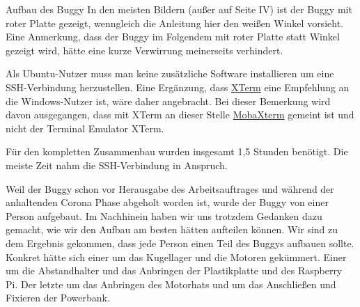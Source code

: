 \documentclass[12pt,twoside]{report}
\begin{document}
\begin{section}{Aufbau des Buggy}
In den meisten Bildern (außer auf Seite IV) ist der Buggy mit roter Platte gezeigt, wenngleich die Anleitung hier den weißen Winkel vorsieht. Eine Anmerkung, dass der Buggy im Folgendem mit roter Platte statt Winkel gezeigt wird, hätte eine kurze Verwirrung meinerseits verhindert.

Als Ubuntu-Nutzer muss man keine zusätzliche Software installieren um eine SSH-Verbindung herzustellen. Eine Ergänzung, dass \href{https://invisible-island.net/xterm/}{XTerm} eine Empfehlung an die Windows-Nutzer ist, wäre daher angebracht. Bei dieser Bemerkung wird davon ausgegangen, dass mit XTerm an dieser Stelle \href{https://mobaxterm.mobatek.net/}{MobaXterm} gemeint ist und nicht der Terminal Emulator XTerm. 

Für den kompletten Zusammenbau wurden insgesamt 1,5 Stunden benötigt. Die meiste Zeit nahm die SSH-Verbindung in Anspruch.

Weil der Buggy schon vor Herausgabe des Arbeitsauftrages und während der anhaltenden Corona Phase abgeholt worden ist, wurde der Buggy von einer Person aufgebaut. Im Nachhinein haben wir uns trotzdem Gedanken dazu gemacht, wie wir den Aufbau am besten hätten aufteilen können. Wir sind zu dem Ergebnis gekommen, dass jede Person einen Teil des Buggys aufbauen sollte. Konkret hätte sich einer um das Kugellager und die Motoren gekümmert. Einer um die Abstandhalter und das Anbringen der Plastikplatte und des Raspberry Pi. Der letzte um das Anbringen des Motorhats und um das Anschließen und Fixieren der Powerbank.

\end{section}
\end{document}
